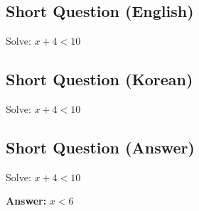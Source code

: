 \cleardoublepage
\subsection*{Short Question (English)}
Solve: $x + 4 < 10$


\newpage
\subsection*{Short Question (Korean)}
Solve: $x + 4 < 10$


\newpage
\subsection*{Short Question (Answer)}
Solve: $x + 4 < 10$

\textbf{Answer:} $x < 6$
